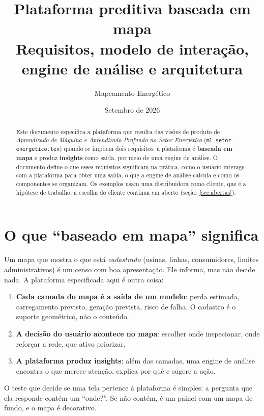 \documentclass[11pt,a4paper]{article}
\title{Plataforma preditiva baseada em mapa\\[4pt]
\large Requisitos, modelo de interação, engine de análise e arquitetura}
\author{Mapeamento Energético}
\date{Setembro de 2026}
\begin{document}
\maketitle

\begin{abstract}
Este documento especifica a plataforma que resulta das visões de produto de
\emph{Aprendizado de Máquina e Aprendizado Profundo no Setor Energético}
(\texttt{ml-setor-energetico.tex}) quando se impõem dois requisitos: a
plataforma é \textbf{baseada em mapa} e produz \textbf{insights} como saída,
por meio de uma engine de análise. O documento define o que esses requisitos
significam na prática, como o usuário interage com a plataforma para obter
uma saída, o que a engine de análise calcula e como os componentes se
organizam. Os exemplos usam uma distribuidora como cliente, que é a hipótese
de trabalho; a escolha do cliente continua em aberto
(seção~\ref{sec:abertas}).
\end{abstract}

\tableofcontents
\newpage

\section{O que ``baseado em mapa'' significa}

Um mapa que mostra o que está \emph{cadastrado} (usinas, linhas, consumidores,
limites administrativos) é um censo com boa apresentação. Ele informa, mas
não decide nada. A plataforma especificada aqui é outra coisa:

\begin{enumerate}
  \item \textbf{Cada camada do mapa é a saída de um modelo}: perda estimada,
    carregamento previsto, geração prevista, risco de falha. O cadastro é o
    suporte geométrico, não o conteúdo.
  \item \textbf{A decisão do usuário acontece no mapa}: escolher onde
    inspecionar, onde reforçar a rede, que ativo priorizar.
  \item \textbf{A plataforma produz insights}: além das camadas, uma engine de
    análise encontra o que merece atenção, explica por quê e sugere a ação.
\end{enumerate}

O teste que decide se uma tela pertence à plataforma é simples: a pergunta que
ela responde contém um ``onde?''. Se não contém, é um painel com um mapa de
fundo, e o mapa é decorativo.
\end{document}
